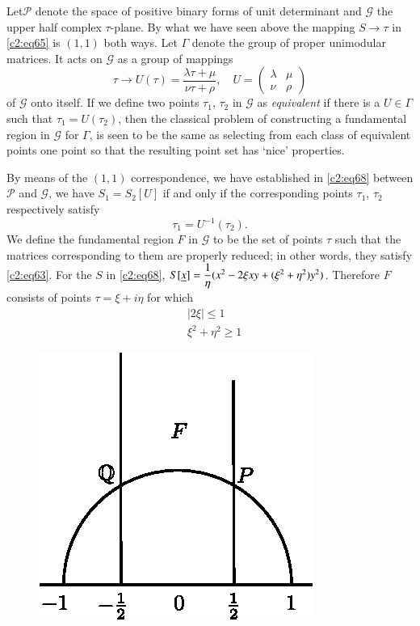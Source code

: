 Let\pageoriginale $\mathscr{P}$ denote the space of positive binary
forms of unit determinant and $\mathscr{G}$ the upper half complex
$\tau$-plane. By what we have seen above the mapping $S\to \tau$ in
\eqref{c2:eq65} is $(1,1)$ both ways. Let $\Gamma$ denote the group of
proper unimodular matrices. It acts on $\mathscr{G}$ as a group of
mappings
\begin{equation*}
\tau\to U(\tau)=\frac{\lambda\tau+\mu}{\nu\tau+\rho},\quad U=
\begin{pmatrix}
\lambda & \mu\\
\nu & \rho
\end{pmatrix}\tag{69}\label{c2:eq69}
\end{equation*}
of $\mathscr{G}$ onto itself. If we define two points $\tau_{1}$,
$\tau_{2}$ in $\mathscr{G}$ as {\em equivalent} if there is a
$U\in\Gamma$ such that $\tau_{1}=U(\tau_{2})$, then the classical
problem of constructing a fundamental region in $\mathscr{G}$ for
$\Gamma$, is seen to be the same as selecting from each class of
equivalent points one point so that the resulting point set has `nice'
properties. 

By means of the $(1,1)$ correspondence, we have established in
\eqref{c2:eq68} between $\mathscr{P}$ and $\mathscr{G}$, we have
$S_{1}=S_{2}[U]$ if and only if the corresponding points $\tau_{1}$,
$\tau_{2}$ respectively satisfy
$$
\tau_{1}=U^{-1}(\tau_{2}).
$$
We define the fundamental region $F$ in $\mathscr{G}$ to be the set of
points $\tau$ such that the matrices corresponding to them are
properly reduced; in other words, they satisfy \eqref{c2:eq63}. For the $S$
in \eqref{c2:eq68}, $S[\underline{x}]=\dfrac{1}{\eta}(x^{2}-2\xi
xy+(\xi^{2}+\eta^{2})y^{2})$. Therefore $F$ consists of points
$\tau=\xi+i\eta$ for which 
\begin{equation*}
\begin{split}
& |2\xi |\leq 1\\
& \xi^{2}+\eta^{2}\geq 1
\end{split}\tag{70}\label{c2:eq70}
\end{equation*}

\begin{figure}[H]
\centering
\includegraphics{fig1.eps}
\end{figure}

